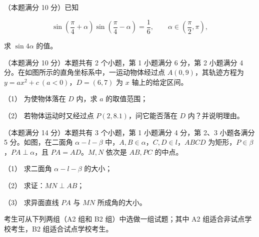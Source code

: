 \begin{question}
（本题满分 10 分）已知

\nopagebreak[4]
\[
\sin\left(\dfrac{\pi}{4}+\alpha\right)\sin\left(\dfrac{\pi}{4}-\alpha\right)=\dfrac16,\qquad \alpha\in\left(\dfrac\pi2,\pi\right),
\]

求 $\sin4\alpha$ 的值。

\Needspace{0.4\textheight}
\end{question}
\begin{question}
（本题满分 10 分）本题共有 2 个小题，第 1 小题满分 6 分，第 2 小题满分 4 分。在如图所示的直角坐标系中，一运动物体经过点 $A(0,9)$，其轨迹方程为 $y=ax^2+c\ (a<0)$，$D=(6,7)$ 为 $x$ 轴上的给定区间。

（1） 为使物体落在 $D$ 内，求 $a$ 的取值范围；

（2） 若物体运动时又经过点 $P(2,8.1)$，问它能否落在 $D$ 内？并说明理由。
\nopagebreak[4]
\begin{center}\end{center}
\nopagebreak[4]
\Needspace{0.4\textheight}
\end{question}
\begin{question}
（本题满分 14 分）本题共有 3 个小题，第 1 小题满分 4 分，第 2、3 小题各满分 5 分。如图，在二面角 $\alpha-l-\beta$ 中，$A,B\in\alpha$，$C,D\in l$，$ABCD$ 为矩形，$P\in\beta$，$PA\perp\alpha$，且 $PA=AD$。$M,N$ 依次是 $AB,PC$ 的中点。

（1） 求二面角 $\alpha-l-\beta$ 的大小；

（2） 求证：$MN\perp AB$；

（3） 求异面直线 $PA$ 与 $MN$ 所成角的大小。
\nopagebreak[4]
\begin{center}\end{center}
\nopagebreak[4]
\end{question}

考生可从下列两组（A2 组和 B2 组）中选做一组试题；其中 A2 组适合非试点学校考生，B2 组适合试点学校考生。

